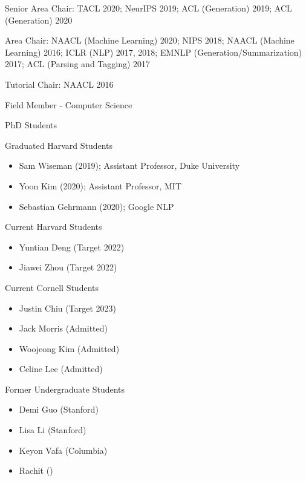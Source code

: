 \documentclass[10pt]{article}
\begin{document}
{\ind Senior Area Chair:
\ind TACL 2020; NeurIPS 2019; ACL (Generation) 2019; ACL (Generation) 2020

\ind Area Chair:
\ind NAACL (Machine Learning) 2020; NIPS 2018; NAACL (Machine Learning) 2016; ICLR (NLP) 2017, 2018; EMNLP (Generation/Summarization) 2017; ACL (Parsing and Tagging) 2017

\ind Tutorial Chair: NAACL 2016

\bigskip

\medskip

\ind Field Member - Computer Science

\ind PhD Students


\ind Graduated Harvard Students

\begin{itemize}
\item Sam Wiseman (2019); Assistant Professor, Duke University
\item Yoon Kim (2020); Assistant Professor, MIT
\item Sebastian Gehrmann (2020); Google NLP
\end{itemize}

\ind Current Harvard Students

\begin{itemize}
\item Yuntian Deng (Target 2022)
\item Jiawei Zhou (Target 2022)
\end{itemize}

\ind Current Cornell Students

\begin{itemize}
\item Justin Chiu (Target 2023)
\item Jack Morris (Admitted)
\item Woojeong Kim (Admitted)
\item Celine Lee (Admitted)
\end{itemize}

\ind Former Undergraduate Students

\begin{itemize}
\item Demi Guo (Stanford)
\item Lisa Li (Stanford)
\item Keyon Vafa (Columbia)
\item Rachit ()

\end{itemize}


}
\end{document}

